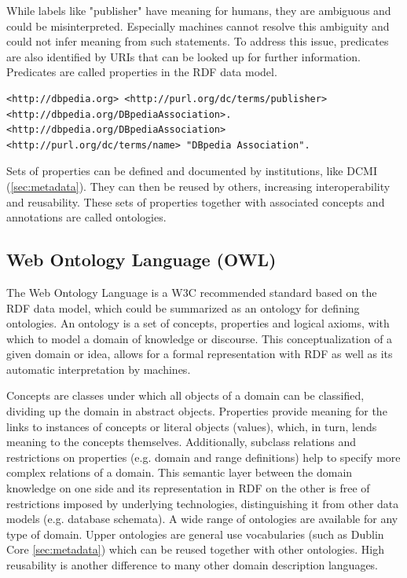 \documentclass[a4paper,english,twoside,BCOR1.5cm,headsepline,DIV12,appendixprefix,final,12pt]{scrbook}
\begin{document}
While labels like "publisher" have meaning for humans, they are ambiguous and could be misinterpreted. 
Especially machines cannot resolve this ambiguity and could not infer meaning from such statements. 
To address this issue, predicates are also identified by URIs that can be looked up for further information.
Predicates are called properties in the RDF data model.

\begin{lstlisting}[language=ttl, label=lst:graph,linewidth=\columnwidth,breaklines=true]
<http://dbpedia.org> <http://purl.org/dc/terms/publisher> <http://dbpedia.org/DBpediaAssociation>.
<http://dbpedia.org/DBpediaAssociation> <http://purl.org/dc/terms/name> "DBpedia Association".
\end{lstlisting}

Sets of properties can be defined and documented by institutions, like DCMI (\cref{sec:metadata}). They can then be reused by others, increasing interoperability and reusability. These sets of properties together with associated concepts and annotations are called ontologies.


\subsection{Web Ontology Language (OWL)}
\label{sec:owl}

The Web Ontology Language is a W3C recommended standard \cite{OWL2} based on the RDF data model, which could be summarized as an ontology for defining ontologies. An ontology is a set of concepts, properties and logical axioms, with which to model a domain of knowledge or discourse. This conceptualization of a given domain or idea, allows for a formal representation with RDF as well as its automatic interpretation by machines.

Concepts are classes under which all objects of a domain can be classified, dividing up the domain in abstract objects. Properties provide meaning for the links to instances of concepts or literal objects (values), which, in turn, lends meaning to the concepts themselves. Additionally, subclass relations and restrictions on properties (e.g. domain and range definitions) help to specify more complex relations of a domain. This semantic layer between the domain knowledge on one side and its representation in RDF on the other is free of restrictions imposed by underlying technologies, distinguishing it from other data models (e.g. database schemata). A wide range of ontologies are available for any type of domain. Upper ontologies are general use vocabularies (such as Dublin Core \cref{sec:metadata}) which can be reused together with other ontologies. High reusability is another difference to many other domain description languages. 
\end{document}
